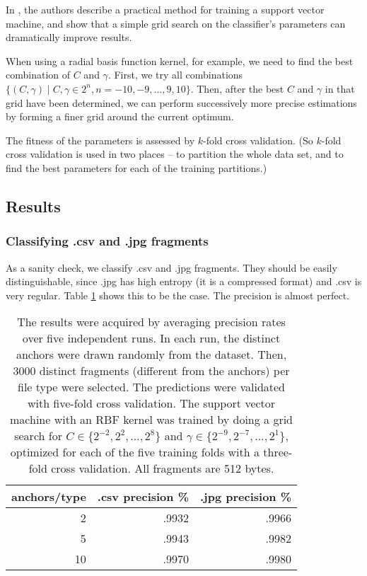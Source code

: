 In \cite{Chih2008}, the authors describe a practical method for training
a support vector machine, and show that a simple grid search on the
classifier's parameters can dramatically improve results.

When using a radial basis function kernel, for example, we need to find
the best combination of $C$ and $\gamma$. First, we try all combinations
$ \{ (C, \gamma) \mid C, \gamma \in 2^{n}, n = -10, -9, \dots, 9, 10 \}$.
Then, after the best $C$ and $\gamma$ in that grid have been determined,
we can perform successively more precise estimations by forming a finer
grid around the current optimum.

The fitness of the parameters is assessed by $k$-fold cross validation.
(So $k$-fold cross validation is used in two places -- to partition
the whole data set, and to find the best parameters for each of the
training partitions.)

\subsection{Results}

\subsubsection{Classifying .csv and .jpg fragments}

As a sanity check, we classify .csv and .jpg fragments. They should be
easily distinguishable, since .jpg has high entropy (it is a compressed
format) and .csv is very regular. Table \ref{table:csv_jpg_recall} shows
this to be the case. The precision is almost perfect.

\begin{table}[h]
\begin{tabular}{rrr}
\hline
   anchors/type &   .csv precision \% &   .jpg precision \% \\
\hline
              2 &           .9932 &           .9966 \\
              5 &           .9943 &           .9982 \\
              10 &          .9970 &           .9980 \\
\hline
\end{tabular}
\caption{
The results were acquired by averaging precision rates over five
independent runs. In each run, the distinct anchors were drawn randomly from the dataset.
Then, 3000 distinct fragments (different from the anchors) per file type were selected.
The predictions were validated with five-fold cross validation.
The support vector machine with an RBF kernel was trained by doing a grid search
for $C \in \{ 2^{-2}, 2^{2}, \dots, 2^{8} \}$ and $\gamma \in \{2^{-9},
2^{-7}, \dots, 2^{1} \}$, optimized for each of the five training folds with a three-fold
cross validation. All fragments are 512 bytes.}
\label{table:csv_jpg_recall}
\end{table}

